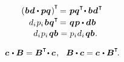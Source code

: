 \nopagebreak\vspace{-0.2em}
\begin{equation*}
\begin{array}{r@{\hspace{.3em}}c@{\hspace{.3em}}l}
\left(\hspace{.1ex} \bm{b} \hspace{.1ex} \bm{d} \dotp \bm{p} \bm{q} \hspace{.1ex}\right)^{\hspace{-0.1ex}\T} & \hspace{-0.5ex} = & \hspace{-0.1ex} \bm{p} \bm{q}^{\T} \hspace{-0.4ex} \dotp \bm{b} \hspace{.1ex} \bm{d}^{\hspace{.1ex}\T}
\\[.2em]
d_i  \hspace{.1ex} p_i \hspace{.25ex} \bm{b} \hspace{.1ex} \bm{q}^{\T} & \hspace{-0.5ex} = & \hspace{-0.1ex} \bm{q} \hspace{.1ex} \bm{p} \dotp \bm{d}  \hspace{.1ex} \bm{b}
\\[.1em]
d_i  \hspace{.1ex} p_i \hspace{.25ex} \bm{q} \bm{b} & = & p_i  \hspace{.1ex} d_i \hspace{.25ex} \bm{q} \bm{b}
\hspace{.1ex} .
\end{array}
\end{equation*}

\noindent
{}

\nopagebreak\vspace{-0.2em}
\begin{equation}%
\bm{c} \hspace{.2ex} \dotp \bm{B}
= \bm{B}^{\T} \hspace{-0.4ex} \dotp \bm{c}
\hspace{.2ex} , \hspace{.7em}
%
\bm{B} \dotp \bm{c}
= \bm{c} \hspace{.2ex} \dotp \bm{B}^{\T}
\hspace{-0.3ex} .
\end{equation}

